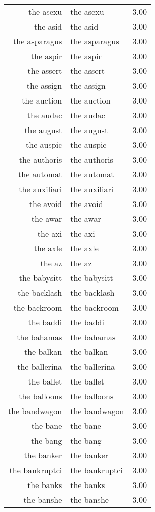 \begin{table}[ht]
\begin{tabular}{rlr}
  the asexu & the asexu & 3.00 \\ 
  the asid & the asid & 3.00 \\ 
  the asparagus & the asparagus & 3.00 \\ 
  the aspir & the aspir & 3.00 \\ 
  the assert & the assert & 3.00 \\ 
  the assign & the assign & 3.00 \\ 
  the auction & the auction & 3.00 \\ 
  the audac & the audac & 3.00 \\ 
  the august & the august & 3.00 \\ 
  the auspic & the auspic & 3.00 \\ 
  the authoris & the authoris & 3.00 \\ 
  the automat & the automat & 3.00 \\ 
  the auxiliari & the auxiliari & 3.00 \\ 
  the avoid & the avoid & 3.00 \\ 
  the awar & the awar & 3.00 \\ 
  the axi & the axi & 3.00 \\ 
  the axle & the axle & 3.00 \\ 
  the az & the az & 3.00 \\ 
  the babysitt & the babysitt & 3.00 \\ 
  the backlash & the backlash & 3.00 \\ 
  the backroom & the backroom & 3.00 \\ 
  the baddi & the baddi & 3.00 \\ 
  the bahamas & the bahamas & 3.00 \\ 
  the balkan & the balkan & 3.00 \\ 
  the ballerina & the ballerina & 3.00 \\ 
  the ballet & the ballet & 3.00 \\ 
  the balloons & the balloons & 3.00 \\ 
  the bandwagon & the bandwagon & 3.00 \\ 
  the bane & the bane & 3.00 \\ 
  the bang & the bang & 3.00 \\ 
  the banker & the banker & 3.00 \\ 
  the bankruptci & the bankruptci & 3.00 \\ 
  the banks & the banks & 3.00 \\ 
  the banshe & the banshe & 3.00 \\ 

\end{tabular}
\end{table}
